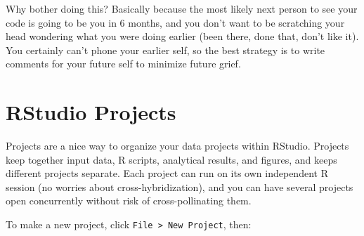 \documentclass[12pt,letterpaperpaper,openany]{book}
\begin{document}
Why bother doing this? Basically because the most likely next person to see your code is going to be you in 6 months, and you don't want to be scratching your head wondering what you were doing earlier (been there, done that, don't like it). You certainly can't phone your earlier self, so the best strategy is to write comments for your future self to minimize future grief.

\hypertarget{rstudio-projects}{%
\section{RStudio Projects}\label{rstudio-projects}}

Projects are a nice way to organize your data projects within RStudio. Projects keep together input data, R scripts, analytical results, and figures, and keeps different projects separate. Each project can run on its own independent R session (no worries about cross-hybridization), and you can have several projects open concurrently without risk of cross-pollinating them.

To make a new project, click \texttt{File\ \textgreater{}\ New\ Project}, then:
\end{document}
